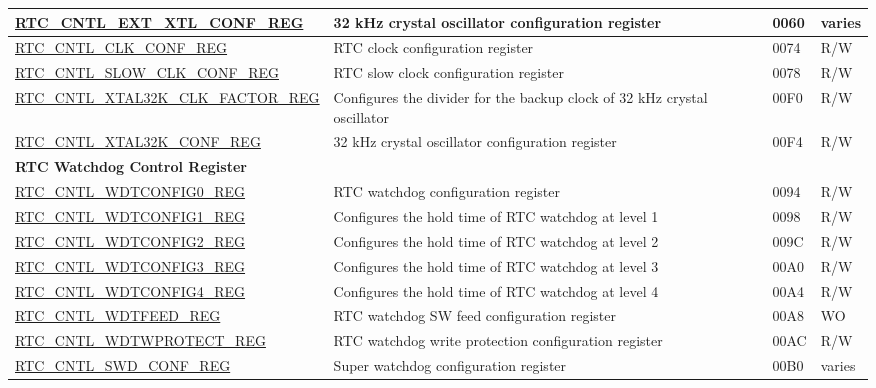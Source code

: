 \begin{longtable}{ | p{6.5cm} | p{6.8cm} | p{1.3cm} | p{1cm} | }
\hyperref[regdesc:RTCCNTLEXTXTLCONFREG]{RTC\_CNTL\_EXT\_XTL\_CONF\_REG} & 32 kHz crystal oscillator configuration register & \hexprefix{}0060 & varies \\ \hline
\hyperref[regdesc:RTCCNTLCLKCONFREG]{RTC\_CNTL\_CLK\_CONF\_REG} & RTC clock configuration register & \hexprefix{}0074 & R/W \\ \hline
\hyperref[regdesc:RTCCNTLSLOWCLKCONFREG]{RTC\_CNTL\_SLOW\_CLK\_CONF\_REG} & RTC slow clock configuration register & \hexprefix{}0078 & R/W \\ \hline
\hyperref[regdesc:RTCCNTLXTAL32KCLKFACTORREG]{RTC\_CNTL\_XTAL32K\_CLK\_FACTOR\_REG} & Configures the divider for the backup clock of 32 kHz crystal oscillator & \hexprefix{}00F0 & R/W \\ \hline
\hyperref[regdesc:RTCCNTLXTAL32KCONFREG]{RTC\_CNTL\_XTAL32K\_CONF\_REG} & 32 kHz crystal oscillator configuration register & \hexprefix{}00F4 & R/W \\ \hline
\multicolumn{4}{|l|}{\textbf{RTC Watchdog Control Register}} \\ \hline
\hyperref[regdesc:RTCCNTLWDTCONFIG0REG]{RTC\_CNTL\_WDTCONFIG0\_REG} & RTC watchdog configuration register & \hexprefix{}0094 & R/W \\ \hline
\hyperref[regdesc:RTCCNTLWDTCONFIG1REG]{RTC\_CNTL\_WDTCONFIG1\_REG} & Configures the hold time of RTC watchdog at level 1  & \hexprefix{}0098 & R/W \\ \hline
\hyperref[regdesc:RTCCNTLWDTCONFIG2REG]{RTC\_CNTL\_WDTCONFIG2\_REG} & Configures the hold time of RTC watchdog at level 2  & \hexprefix{}009C & R/W \\ \hline
\hyperref[regdesc:RTCCNTLWDTCONFIG3REG]{RTC\_CNTL\_WDTCONFIG3\_REG} & Configures the hold time of RTC watchdog at level 3  & \hexprefix{}00A0 & R/W \\ \hline
\hyperref[regdesc:RTCCNTLWDTCONFIG4REG]{RTC\_CNTL\_WDTCONFIG4\_REG} & Configures the hold time of RTC watchdog at level 4  & \hexprefix{}00A4 & R/W \\ \hline
\hyperref[regdesc:RTCCNTLWDTFEEDREG]{RTC\_CNTL\_WDTFEED\_REG} & RTC watchdog SW feed configuration register & \hexprefix{}00A8 & WO \\ \hline
\hyperref[regdesc:RTCCNTLWDTWPROTECTREG]{RTC\_CNTL\_WDTWPROTECT\_REG} & RTC watchdog write protection configuration register & \hexprefix{}00AC & R/W \\ \hline
\hyperref[regdesc:RTCCNTLSWDCONFREG]{RTC\_CNTL\_SWD\_CONF\_REG} & Super watchdog configuration register & \hexprefix{}00B0 & varies \\ \hline

\end{longtable}
